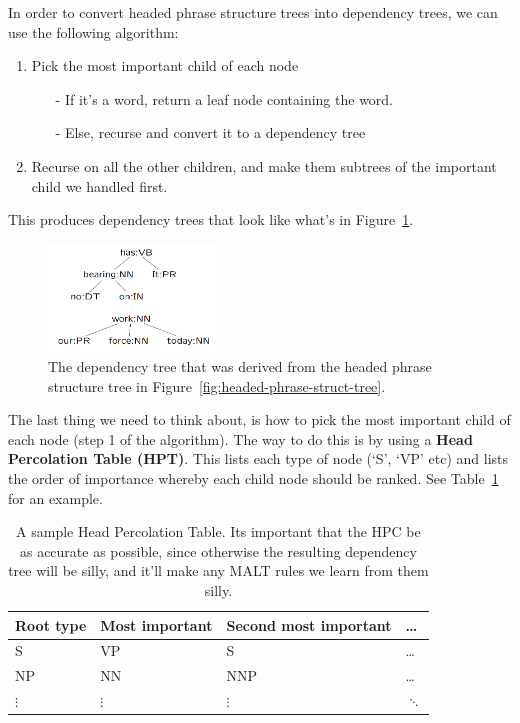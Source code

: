 In order to convert headed phrase structure trees into dependency trees, we can
use the following algorithm:

\begin{enumerate}
  \item Pick the most important child of each node
  \begin{itemize}
    \item[-] If it's a word, return a leaf node containing the word.
    \item[-] Else, recurse and convert it to a dependency tree
  \end{itemize}
  \item Recurse on all the other children, and make them subtrees of the 
  important child we handled first.
\end{enumerate}

This produces dependency trees that look like what's in
Figure~\ref{fig:converted-dep-tree}.

\begin{figure}[h]
  \centering
  \includegraphics[width=0.4\textwidth]{images/converted-dep-tree}
  \caption{The dependency tree that was derived from the headed phrase structure 
  tree in Figure~\ref{fig:headed-phrase-struct-tree}.}
  \label{fig:converted-dep-tree}
\end{figure}

The last thing we need to think about, is how to pick the most important child
of each node (step 1 of the algorithm). The way to do this is by using a
\textbf{Head Percolation Table (HPT)}. This lists each type of node (`S', `VP'
etc) and lists the order of importance whereby each child node should be ranked.
See Table~\ref{tbl:HPT} for an example.

\begin{table}[h]
  \centering
  \begin{tabular}{|l|l|l|l|}
    \hline
    Root type & Most important & Second most important & \dots \\ \hline
    S & VP & S & \dots\\ \hline
    NP & NN & NNP & \dots\\ \hline
    $\vdots$ & $\vdots$ & $\vdots$ & $\ddots$\\ \hline
  \end{tabular}
  \caption{A sample Head Percolation Table. Its important that the HPC be as 
  accurate as possible, since otherwise the resulting dependency tree will be 
  silly, and it'll make any MALT rules we learn from them silly.}
  \label{tbl:HPT}
\end{table}


